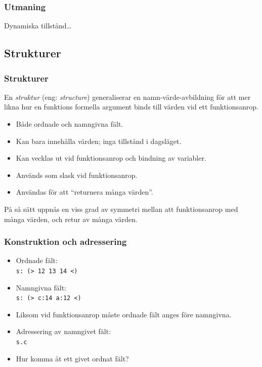 \documentclass[noamsthm,handout]{beamer}
\newcommand{\inEnglish}[1]{(eng: \emph{#1})}
\begin{document}
\begin{frame}\frametitle{Utmaning}
  Dynamiska tillstånd\ldots
\end{frame}

\subsection{Strukturer}
\begin{frame}\frametitle{Strukturer}
  En \emph{struktur} \inEnglish{structure} generaliserar en namn-värde-avbildning för att mer likna hur en funktions formella argument binds till värden vid ett funktionsanrop.

  \begin{itemize}
  \item Både ordnade och namngivna fält.
  \item Kan bara innehålla värden; inga tillstånd i dagsläget.
  \item Kan vecklas ut vid funktionsanrop och bindning av variabler.
  \item Används som slask vid funktionsanrop.
  \item Användas för att ``returnera många värden''.
  \end{itemize}

  På så sätt uppnås en viss grad av symmetri mellan att funktionsanrop med många värden, och retur av många värden.

\end{frame}
\begin{frame}\frametitle{Konstruktion och adressering}
  \begin{itemize}
  \item Ordnade fält:\\
    \texttt{s: {\color{red}(>} 12 13 14 {\color{red}<)}}
  \item Namngivna fält:\\
    \texttt{s: {\color{red}(>} c:14 a:12 {\color{red}<)}}
  \item Liksom vid funktionsanrop måste ordnade fält anges före namngivna.
  \item Adressering av namngivet fält:\\
    \texttt{s{\color{red}.}c}
  \item Hur komma åt ett givet ordnat fält?
  \end{itemize}
\end{frame}
\end{document}
